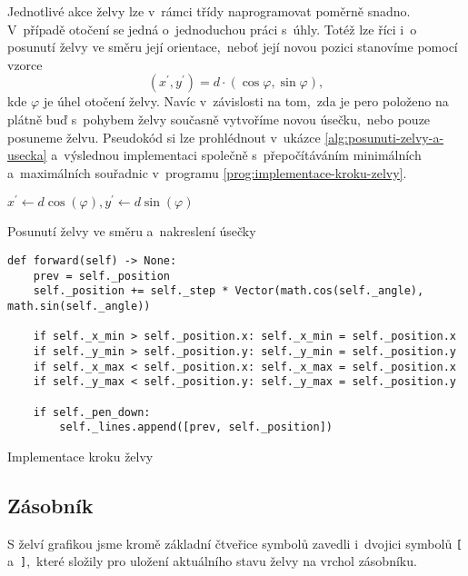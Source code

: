 Jednotlivé akce želvy lze v~rámci třídy naprogramovat poměrně snadno. V~případě otočení se jedná o~jednoduchou práci s~úhly. Totéž lze říci i~o posunutí želvy ve směru její orientace,~neboť její novou pozici stanovíme pomocí vzorce
\[(x^\prime,y^\prime)=d\cdot(\cos\varphi,\sin\varphi),\]
kde $\varphi$ je úhel otočení želvy. Navíc v~závislosti na tom,~zda je pero položeno na plátně buď s~pohybem želvy současně vytvoříme novou úsečku,~nebo pouze posuneme želvu. Pseudokód si lze prohlédnout v~ukázce \ref{alg:posunuti-zelvy-a-usecka} a~výslednou implementaci společně s~přepočítáváním minimálních a~maximálních souřadnic v~programu \ref{prog:implementace-kroku-zelvy}.
\begin{algorithm}[h]
    $x^\prime\gets d\cos(\varphi),y^\prime\gets d\sin(\varphi)$\;
    \;
    \caption{Posunutí želvy ve směru a~nakreslení úsečky}
    \label{alg:posunuti-zelvy-a-usecka}
\end{algorithm}
\begin{program}[h]
\begin{lstlisting}[style=python]
def forward(self) -> None:
    prev = self._position
    self._position += self._step * Vector(math.cos(self._angle), math.sin(self._angle))

    if self._x_min > self._position.x: self._x_min = self._position.x
    if self._y_min > self._position.y: self._y_min = self._position.y
    if self._x_max < self._position.x: self._x_max = self._position.x
    if self._y_max < self._position.y: self._y_max = self._position.y

    if self._pen_down:
        self._lines.append([prev, self._position])
\end{lstlisting}
    \caption{Implementace kroku želvy}
    \label{prog:implementace-kroku-zelvy}
\end{program}

\subsection{Zásobník}\label{subsec:zasobnik}

S želví grafikou jsme kromě základní čtveřice symbolů zavedli i~dvojici symbolů \texttt{[} a~\texttt{]},~které složily pro uložení aktuálního stavu želvy na vrchol zásobníku.

